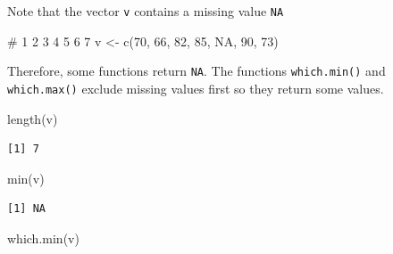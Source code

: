 \documentclass[
  letterpaper,
  DIV=11,
  numbers=noendperiod]{scrreprt}
\newenvironment{Shaded}{\begin{snugshade}}{\end{snugshade}}
\newcommand{\CommentTok}[1]{\textcolor[rgb]{0.37,0.37,0.37}{#1}}
\newcommand{\ConstantTok}[1]{\textcolor[rgb]{0.56,0.35,0.01}{#1}}
\newcommand{\DecValTok}[1]{\textcolor[rgb]{0.68,0.00,0.00}{#1}}
\newcommand{\FunctionTok}[1]{\textcolor[rgb]{0.28,0.35,0.67}{#1}}
\newcommand{\NormalTok}[1]{\textcolor[rgb]{0.00,0.23,0.31}{#1}}
\newcommand{\OtherTok}[1]{\textcolor[rgb]{0.00,0.23,0.31}{#1}}
\begin{document}
\begin{tcolorbox}[enhanced jigsaw, colbacktitle=quarto-callout-tip-color!10!white, opacitybacktitle=0.6, breakable, left=2mm, leftrule=.75mm, toprule=.15mm, toptitle=1mm, bottomtitle=1mm, colframe=quarto-callout-tip-color-frame, opacityback=0, coltitle=black, arc=.35mm, titlerule=0mm, colback=white, bottomrule=.15mm, title=\textcolor{quarto-callout-tip-color}{\faLightbulb}\hspace{0.5em}{Answer}, rightrule=.15mm]

Note that the vector \texttt{v} contains a missing value \texttt{NA}

\begin{Shaded}
\begin{Highlighting}[]
\CommentTok{\#       1   2   3   4   5   6   7}
\NormalTok{v }\OtherTok{\textless{}{-}} \FunctionTok{c}\NormalTok{(}\DecValTok{70}\NormalTok{, }\DecValTok{66}\NormalTok{, }\DecValTok{82}\NormalTok{, }\DecValTok{85}\NormalTok{, }\ConstantTok{NA}\NormalTok{, }\DecValTok{90}\NormalTok{, }\DecValTok{73}\NormalTok{)}
\end{Highlighting}
\end{Shaded}

Therefore, some functions return \texttt{NA}. The functions
\texttt{which.min()} and \texttt{which.max()} exclude missing values
first so they return some values.

\begin{Shaded}
\begin{Highlighting}[]
\FunctionTok{length}\NormalTok{(v)}
\end{Highlighting}
\end{Shaded}

\begin{verbatim}
[1] 7
\end{verbatim}

\begin{Shaded}
\begin{Highlighting}[]
\FunctionTok{min}\NormalTok{(v)}
\end{Highlighting}
\end{Shaded}

\begin{verbatim}
[1] NA
\end{verbatim}

\begin{Shaded}
\begin{Highlighting}[]
\FunctionTok{which.min}\NormalTok{(v)}
\end{Highlighting}
\end{Shaded}


\end{tcolorbox}
\end{document}
